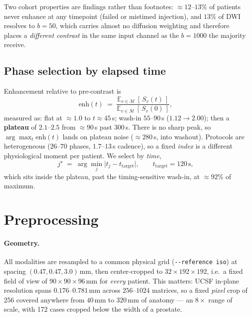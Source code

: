 \documentclass[11pt]{article}
\newcommand{\roi}{\mathcal{M}}
\newcommand{\Ex}{\mathbb{E}}
\newcommand{\1}{\mathbb{1}}
\begin{document}
Two cohort properties are findings rather than footnotes: $\approx12$--$13\%$ of patients
never enhance at any timepoint (failed or mistimed injection), and $13\%$ of DWI resolves
to $b{=}50$, which carries almost no diffusion weighting and therefore places a
\emph{different contrast} in the same input channel as the $b{=}1000$ the majority receive.

\subsection{Phase selection by elapsed time}

Enhancement relative to pre-contrast is
\begin{equation}
\text{enh}(t)\;=\;\frac{\Ex_{v\in\roi}\,[\,S_v(t)\,]}{\Ex_{v\in\roi}\,[\,S_v(0)\,]},
\end{equation}
measured as: flat at $\approx 1.0$ to $t\approx45$\,s; wash-in $55$--$90$\,s
($1.12\!\to\!2.00$); then a \textbf{plateau} of $2.1$--$2.5$ from $\approx 90$\,s past
$300$\,s. There is no sharp peak, so $\arg\max_t \text{enh}(t)$ lands on plateau noise
($\approx 280$\,s, into washout). Protocols are heterogeneous ($26$--$70$ phases,
$1.7$--$13$\,s cadence), so a fixed \emph{index} is a different physiological moment per
patient. We select by \emph{time},
\begin{equation}
j^\star \;=\; \arg\min_j \bigl| t_j - t_{\text{target}} \bigr|,
\qquad t_{\text{target}} = 120\,\text{s},
\end{equation}
which sits inside the plateau, past the timing-sensitive wash-in, at $\approx92\%$ of maximum.

\section{Preprocessing}

\paragraph{Geometry.} All modalities are resampled to a common physical grid
(\texttt{-{}-reference iso}) at spacing $(0.47,0.47,3.0)$\,mm, then center-cropped to
$32\times192\times192$, i.e.\ a fixed field of view of $90\times90\times96$\,mm for
\emph{every} patient. This matters: UCSF in-plane resolution spans $0.176$--$0.781$\,mm
across $256$--$1024$ matrices, so a fixed \emph{pixel} crop of 256 covered anywhere from
$40$\,mm to $320$\,mm of anatomy --- an $8\times$ range of scale, with 172 cases cropped
below the width of a prostate.
\end{document}
